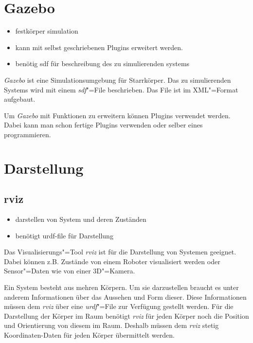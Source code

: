 
\section{Gazebo}
\begin{itemize}
\item festkörper simulation
\item kann mit selbst geschriebenen Plugins erweitert werden.
\item benötig sdf für beschreibung des zu simulierenden systems
\end{itemize}

\textit{Gazebo} ist eine Simulationsumgebung für Starrkörper.
Das zu simulierenden Systems wird mit einem \textit{sdf}"=File beschrieben. %
Das File ist im XML"=Format aufgebaut.

Um \textit{Gazebo} mit Funktionen zu erweitern können Plugins verwendet werden.
Dabei kann man schon fertige Plugins verwenden oder selber eines programmieren. %

\section{Darstellung}
\subsection{rviz}
\begin{itemize}
\item darstellen von System und deren Zuständen
\item benötigt urdf-file für Darstellung
\end{itemize}
Das Visualisierungs"=Tool \textit{rviz} ist für die Darstellung von Systemen geeignet.
Dabei können z.B. Zustände von einem Roboter visualisiert werden oder Sensor"=Daten wie von einer 3D"=Kamera.

Ein System besteht aus mehren Körpern.
Um sie darzustellen braucht es unter anderem Informationen über das Aussehen und Form dieser.
Diese Informationen müssen dem \textit{rviz} über eine \textit{urdf}"=File zur Verfügung gestellt werden. %
Für die Darstellung der Körper im Raum benötigt \textit{rviz} für jeden Körper noch die Position und Orientierung von diesem im Raum.
Deshalb müssen dem \textit{rviz} stetig Koordinaten-Daten für jeden Körper übermittelt werden. %

